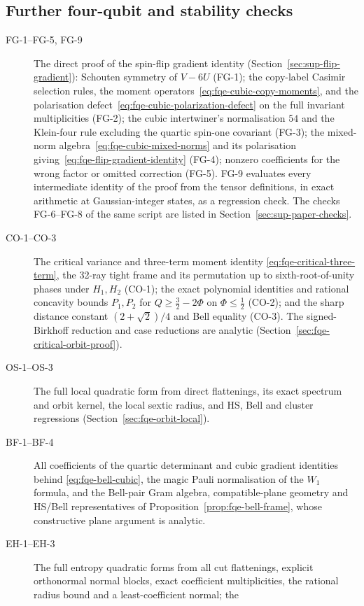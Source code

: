 \subsection{Further four-qubit and stability checks}
\begin{description}
\item[FG-1--FG-5, FG-9] The direct proof of the spin-flip gradient identity (Section~\ref{sec:sup-flip-gradient}): Schouten symmetry
of $V-6U$ (FG-1); the copy-label Casimir selection rules, the moment operators~\eqref{eq:fqe-cubic-copy-moments}, and the
polarisation defect~\eqref{eq:fqe-cubic-polarization-defect} on the full invariant multiplicities (FG-2); the cubic intertwiner's
normalisation $54$ and the Klein-four rule excluding the quartic spin-one covariant (FG-3); the mixed-norm
algebra~\eqref{eq:fqe-cubic-mixed-norms} and its polarisation giving~\eqref{eq:fqe-flip-gradient-identity} (FG-4); nonzero coefficients
for the wrong factor or omitted correction (FG-5). FG-9 evaluates every intermediate identity of the proof from the tensor
definitions, in exact arithmetic at Gaussian-integer states, as a regression check. The checks FG-6--FG-8 of the same script
are listed in Section~\ref{sec:sup-paper-checks}.
\item[CO-1--CO-3] The critical variance and three-term moment identity \eqref{eq:fqe-critical-three-term},
the 32-ray tight frame and its permutation up to sixth-root-of-unity phases under $H_1,H_2$ (CO-1);
the exact polynomial identities and rational concavity bounds $P_1,P_2$ for $Q\ge\tfrac32-2\Phi$ on
$\Phi\le\tfrac12$ (CO-2); and the sharp distance constant $(2+\sqrt2)/4$ and Bell equality (CO-3).
The signed-Birkhoff reduction and case reductions are analytic
(Section~\ref{sec:fqe-critical-orbit-proof}).
\item[OS-1--OS-3] The full local quadratic form from direct flattenings, its exact spectrum and orbit
kernel, the local sextic radius, and HS, Bell and cluster regressions
(Section~\ref{sec:fqe-orbit-local}).
\item[BF-1--BF-4] All coefficients of the quartic determinant and cubic gradient identities behind \eqref{eq:fqe-bell-cubic}, the magic
Pauli normalisation of the $W_1$ formula, and the Bell-pair Gram algebra,
compatible-plane geometry and HS/Bell representatives of Proposition~\ref{prop:fqe-bell-frame}, whose
constructive plane argument is analytic.
\item[EH-1--EH-3] The full entropy quadratic forms from all cut flattenings, explicit orthonormal normal
blocks, exact coefficient multiplicities, the rational radius bound and a least-coefficient normal; the

\end{description}
